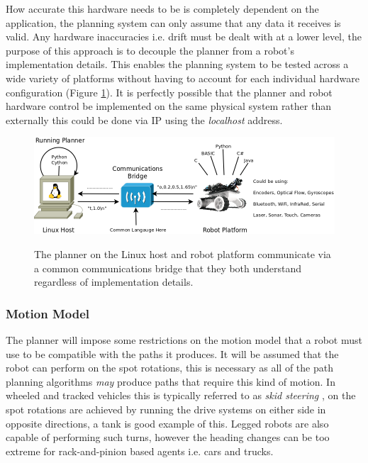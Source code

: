 \noindent
How accurate this hardware needs to be is completely dependent on the application, the planning system can only assume that any data it receives is valid. Any hardware inaccuracies i.e. drift must be dealt with at a lower level, the purpose of this approach is to decouple the planner from a robot's implementation details. This enables the planning system to be tested across a wide variety of platforms without having to account for each individual hardware configuration (Figure \ref{Figure: Hardware Agent Specification.}). It is perfectly possible that the planner and robot hardware control be implemented on the same physical system rather than externally this could be done via IP using the \textit{localhost} address.

\begin{figure}[htbp]

\center \includegraphics[width=400pt]{illustrations/hardware_agent_specification}\\
\caption{The planner on the Linux host and robot platform communicate via a common communications bridge that they both understand regardless of implementation details.} 
\label{Figure: Hardware Agent Specification.}

\end{figure}

\subsubsection{Motion Model}
\noindent
The planner will impose some restrictions on the motion model that a robot must use to be compatible with the paths it produces. It will be assumed that the robot can perform on the spot rotations, this is necessary as all of the path planning algorithms \textit{may} produce paths that require this kind of motion. In wheeled and tracked vehicles this is typically referred to as \textit{skid steering} \cite{JMD14}, on the spot rotations are achieved by running the drive systems on either side in opposite directions, a tank is good example of this. Legged robots are also capable of performing such turns, however the heading changes can be too extreme for rack-and-pinion based agents i.e. cars and trucks. 

